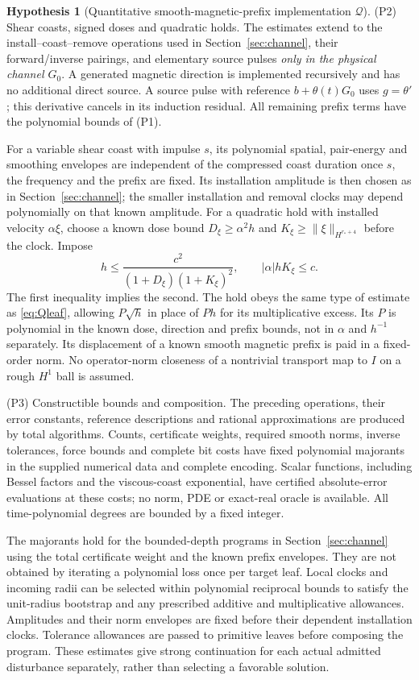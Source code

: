 \documentclass[11pt,a4paper]{amsart}
\theoremstyle{definition}
\newtheorem{hypothesis}[theorem]{Hypothesis}
\theoremstyle{remark}
\numberwithin{equation}{section}
\newcommand{\Qcal}{\mathcal Q}
\newcommand{\norm}[1]{\lVert #1\rVert}
\begin{document}
\begin{hypothesis}[Quantitative smooth-magnetic-prefix implementation $\Qcal$]
\medskip\noindent
\textup{(P2) Shear coasts, signed doses and quadratic holds.}
The estimates extend to the install--coast--remove operations used in Section~\ref{sec:channel}, their forward/inverse pairings, and elementary source pulses \emph{only in the physical channel $G_0$}. A generated magnetic direction is implemented recursively and has no additional direct source. A source pulse with reference $b+\theta(t)G_0$ uses $g=\theta'$; this derivative cancels in its induction residual. All remaining prefix terms have the polynomial bounds of (P1).

For a variable shear coast with impulse $s$, its polynomial spatial, pair-energy and smoothing envelopes are independent of the compressed coast duration once $s$, the frequency and the prefix are fixed. Its installation amplitude is then chosen as in Section~\ref{sec:channel}; the smaller installation and removal clocks may depend polynomially on that known amplitude. For a quadratic hold with installed velocity $\alpha\xi$, choose a known dose bound $D_\xi\ge\alpha^2h$ and $K_\xi\ge\norm\xi_{H^{r_*+4}}$ before the clock. Impose
\[
 h\le\frac{c^2}{(1+D_\xi)(1+K_\xi)^2},\qquad
 |\alpha|hK_\xi\le c.
\]
The first inequality implies the second. The hold obeys the same type of estimate as \eqref{eq:Qleaf}, allowing $P\sqrt h$ in place of $Ph$ for its multiplicative excess. Its $P$ is polynomial in the known dose, direction and prefix bounds, not in $\alpha$ and $h^{-1}$ separately. Its displacement of a known smooth magnetic prefix is paid in a fixed-order norm. No operator-norm closeness of a nontrivial transport map to $I$ on a rough $H^1$ ball is assumed.

\medskip\noindent
\textup{(P3) Constructible bounds and composition.}
The preceding operations, their error constants, reference descriptions and rational approximations are produced by total algorithms. Counts, certificate weights, required smooth norms, inverse tolerances, force bounds and complete bit costs have fixed polynomial majorants in the supplied numerical data and complete encoding. Scalar functions, including Bessel factors and the viscous-coast exponential, have certified absolute-error evaluations at these costs; no norm, PDE or exact-real oracle is available. All time-polynomial degrees are bounded by a fixed integer.

The majorants hold for the bounded-depth programs in Section~\ref{sec:channel} using the total certificate weight and the known prefix envelopes. They are not obtained by iterating a polynomial loss once per target leaf. Local clocks and incoming radii can be selected within polynomial reciprocal bounds to satisfy the unit-radius bootstrap and any prescribed additive and multiplicative allowances. Amplitudes and their norm envelopes are fixed before their dependent installation clocks. Tolerance allowances are passed to primitive leaves before composing the program. These estimates give strong continuation for each actual admitted disturbance separately, rather than selecting a favorable solution.
\end{hypothesis}
\end{document}

